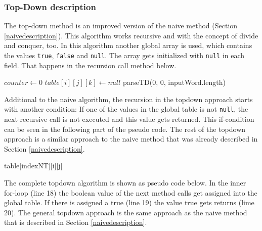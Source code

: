 \documentclass[a4paper, 11pt]{article}
\begin{document}


\subsubsection{Top-Down description}
\label{topdowndescription}


The top-down method is an improved version of the naive method (Section \ref{naivedescription}). This algorithm works recursive and with the concept of divide and conquer, too. In this algorithm another global array is used, which contains the values \texttt{true}, \texttt{false} and \texttt{null}. The array gets initialized with \texttt{null} in each field. That happens in the recursion call method below.

\begin{center}
\label{alg:cap}
\begin{algorithmic}[1]
\State $counter \gets 0$
\State $table[i][j][k] \gets null$
\EndFor
\EndFor
\EndFor
\State \Return parseTD(0, 0, inputWord.length)
\end{algorithmic}
\hrulefill
\end{center}

Additional to the naive algorithm, the recursion in the topdown approach starts with another condition: If one of the values in the global table is not \texttt{null}, the next recursive call is not executed and this value gets returned. This if-condition can be seen in the following part of the pseudo code. The rest of the topdown approach is a similar approach to the naive method that was already described in Section \ref{naivedescription}.

\begin{center}
\label{alg:cap}
\begin{algorithmic}[1]
\State \Return table[indexNT][i][j]
\EndIf
\end{algorithmic}
\hrulefill
\end{center}

The complete topdown algorithm is shown as pseudo code below. In the inner for-loop (line 18) the boolean value of the next method calls get assigned into the global table. If there is assigned a true (line 19) the value true gets returns (lime 20). The general topdown approach is the same approach as the naive method that is described in Section \ref{naivedescription}.
\end{document}
